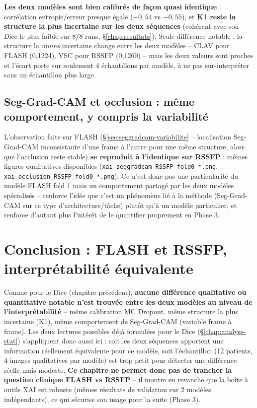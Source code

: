 \documentclass[11pt,a4paper]{report}
\begin{document}
\textbf{Les deux modèles sont bien calibrés de façon quasi identique} : corrélation
entropie/erreur presque égale ($-0{,}54$ vs $-0{,}55$), et \textbf{K1 reste la
structure la plus incertaine sur les deux séquences} (cohérent avec son Dice le
plus faible sur 8/8 runs, \S\ref{chap:resultats}). Seule différence notable : la
structure la \emph{moins} incertaine change entre les deux modèles -- CLAV pour
FLASH (0,1224), VSC pour RSSFP (0,1260) -- mais les deux valeurs sont proches et
l'écart porte sur seulement 4 échantillons par modèle,
à ne pas sur-interpréter sans un échantillon plus large.

\subsection{Seg-Grad-CAM et occlusion : même comportement, y compris la variabilité}

L'observation faite sur FLASH (\S\ref{sec:seggradcam-variabilite} -- localisation
Seg-Grad-CAM inconsistante d'une frame à l'autre pour une même structure, alors que
l'occlusion reste stable) \textbf{se reproduit à l'identique sur RSSFP} : mêmes
figures qualitatives disponibles (\texttt{xai\_seggradcam\_RSSFP\_fold0\_*.png},
\texttt{xai\_occlusion\_RSSFP\_fold0\_*.png}). Ce n'est donc pas une particularité
du modèle FLASH fold 1 mais un comportement partagé par les deux modèles
spécialisés -- renforce l'idée que c'est un phénomène lié à la méthode
(Seg-Grad-CAM sur ce type d'architecture/tâche) plutôt qu'à un modèle particulier,
et renforce d'autant plus l'intérêt de le quantifier proprement en Phase 3.

\section{Conclusion : FLASH et RSSFP, interprétabilité équivalente}

Comme pour le Dice (chapitre précédent), \textbf{aucune différence qualitative ou
quantitative notable n'est trouvée entre les deux modèles au niveau de
l'interprétabilité} -- même calibration MC Dropout, même structure la plus
incertaine (K1), même comportement de Seg-Grad-CAM (variable frame à frame). Les
deux lectures possibles déjà formulées pour le Dice
(\S\ref{chap:analyse-stat}) s'appliquent donc aussi ici : soit les deux séquences
apportent une information réellement équivalente pour ce modèle, soit
l'échantillon (12 patients, 4 images qualitatives par modèle) est trop petit pour
détecter une différence réelle mais modeste. \textbf{Ce chapitre ne permet donc pas
de trancher la question clinique FLASH vs RSSFP} -- il montre en revanche que la
boîte à outils XAI est robuste (mêmes résultats de validation sur 2 modèles
indépendants), ce qui sécurise son usage pour la suite (Phase 3).
\end{document}
